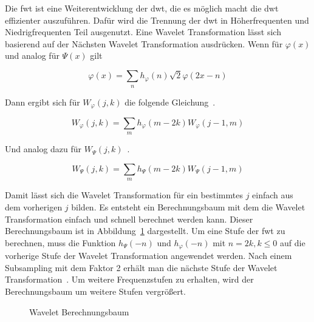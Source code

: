 \documentclass[12pt, a4paper, ngerman]{article}
\begin{document}
Die \ac{fwt} ist eine Weiterentwicklung der \ac{dwt},
die es möglich macht die \ac{dwt} effizienter auszuführen.
Dafür wird die Trennung der \ac{dwt} in Höherfrequenten
und Niedrigfrequenten Teil ausgenutzt.
Eine Wavelet Transformation lässt sich basierend
auf der Nächsten Wavelet Transformation ausdrücken.
Wenn für \(\varphi(x)\) und analog für \(\Psi(x)\) gilt

\[
  \varphi(x) = \sum_n h_{\varphi}(n)\sqrt{2}\varphi(2x-n)
\]

Dann ergibt sich für \(W_\varphi(j,k)\) die folgende Gleichung~\cite[S.11]{wavelet_analysis}.

\[
  W_\varphi(j,k)=\sum_m h_\varphi(m-2k)W_\varphi(j-1,m)
\]

Und analog dazu für \(W_\Psi(j,k)\)~\cite[S.11]{wavelet_analysis}.

\[
  W_\Psi(j,k)=\sum_m h_\Psi(m-2k)W_\Psi(j-1,m)
\]

Damit lässt sich die Wavelet Transformation für ein bestimmtes \(j\)
einfach aus dem vorherigen \(j\) bilden.
Es entsteht ein Berechnungsbaum mit dem die Wavelet Transformation
einfach und schnell berechnet werden kann.
Dieser Berechnungsbaum ist in Abbildung~\ref{fig:wavelet_tree} dargestellt.
Um eine Stufe der \ac{fwt} zu berechnen,
muss die Funktion \(h_\Psi(-n)\) und \(h_\varphi(-n)\) mit \(n=2k,k\leq 0\)
auf die vorherige Stufe der Wavelet Transformation angewendet werden.
Nach einem Subsampling mit dem Faktor 2 erhält man
die nächste Stufe der Wavelet Transformation~\cite[S.12]{wavelet_analysis}.
Um weitere Frequenzstufen zu erhalten,
wird der Berechnungsbaum um weitere Stufen vergrößert.

\begin{figure}
  \centering
  \caption{Wavelet Berechnungsbaum}
  \label{fig:wavelet_tree}
\end{figure}
\end{document}
